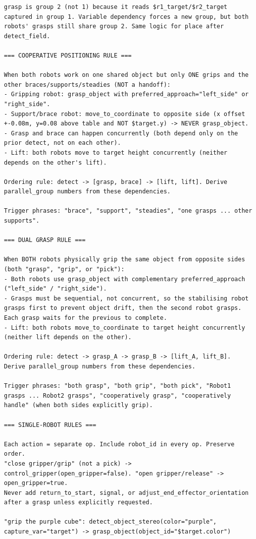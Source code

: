 \documentclass[
     12pt,
     a4paper,
     BCOR=10mm,
     DIV=14,
     listof=totoc,
     bibliography=totoc,
     parskip,
     twoside,
     headsepline
     ]{scrreprt}
\begin{document}
\begin{lstlisting}[caption={The few-shot and rule-based system prompt for the command parser.}, extendedchars=true]
grasp is group 2 (not 1) because it reads $r1_target/$r2_target captured in group 1. Variable dependency forces a new group, but both robots' grasps still share group 2. Same logic for place after detect_field.

=== COOPERATIVE POSITIONING RULE ===

When both robots work on one shared object but only ONE grips and the other braces/supports/steadies (NOT a handoff):
- Gripping robot: grasp_object with preferred_approach="left_side" or "right_side".
- Support/brace robot: move_to_coordinate to opposite side (x offset +-0.08m, y=0.08 above table and NOT $target.y) -> NEVER grasp_object.
- Grasp and brace can happen concurrently (both depend only on the prior detect, not on each other).
- Lift: both robots move to target height concurrently (neither depends on the other's lift).

Ordering rule: detect -> [grasp, brace] -> [lift, lift]. Derive parallel_group numbers from these dependencies.

Trigger phrases: "brace", "support", "steadies", "one grasps ... other supports".

=== DUAL GRASP RULE ===

When BOTH robots physically grip the same object from opposite sides (both "grasp", "grip", or "pick"):
- Both robots use grasp_object with complementary preferred_approach ("left_side" / "right_side").
- Grasps must be sequential, not concurrent, so the stabilising robot grasps first to prevent object drift, then the second robot grasps. Each grasp waits for the previous to complete.
- Lift: both robots move_to_coordinate to target height concurrently (neither lift depends on the other).

Ordering rule: detect -> grasp_A -> grasp_B -> [lift_A, lift_B]. Derive parallel_group numbers from these dependencies.

Trigger phrases: "both grasp", "both grip", "both pick", "Robot1 grasps ... Robot2 grasps", "cooperatively grasp", "cooperatively handle" (when both sides explicitly grip).

=== SINGLE-ROBOT RULES ===

Each action = separate op. Include robot_id in every op. Preserve order.
"close gripper/grip" (not a pick) -> control_gripper(open_gripper=false). "open gripper/release" -> open_gripper=true.
Never add return_to_start, signal, or adjust_end_effector_orientation after a grasp unless explicitly requested.

"grip the purple cube": detect_object_stereo(color="purple", capture_var="target") -> grasp_object(object_id="$target.color")


\end{lstlisting}
\end{document}
